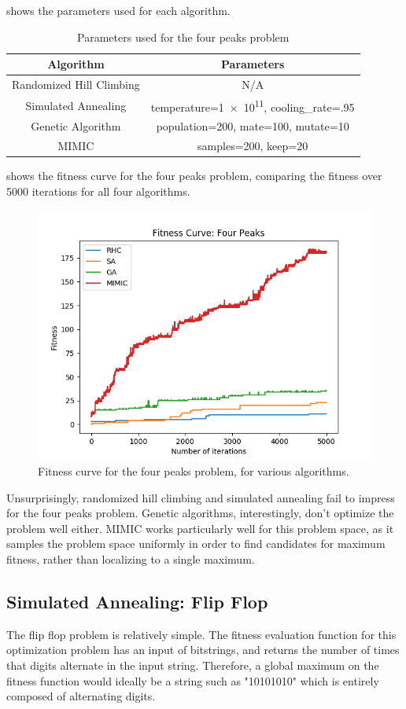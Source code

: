 \documentclass{article}
\begin{document}
       shows the parameters used for each algorithm.

      \begin{table}[h!]
      \centering
        \begin{tabular}{||c|c||}\hline
          \textbf{Algorithm} & \textbf{Parameters} \\ \hline
          Randomized Hill Climbing & N/A \\ \hline
          Simulated Annealing & temperature=\num{1e11}, cooling\_rate=.95 \\ \hline
          Genetic Algorithm & population=200, mate=100, mutate=10 \\ \hline
          MIMIC & samples=200, keep=20 \\ \hline
        \end{tabular}

        \caption{Parameters used for the four peaks problem}
        \label{tab:fp-params}
      \end{table}

       shows the fitness curve for the four peaks problem, comparing the fitness over 5000 iterations for all four algorithms.

      \begin{figure}[htb]
      \centering
      \includegraphics[width=.5\linewidth]{out/op/fourpeaks/fitness.png}
      \caption{Fitness curve for the four peaks problem, for various algorithms.}
      \label{fig:fitness-fp}
      \end{figure}

      Unsurprisingly, randomized hill climbing and simulated annealing fail to impress for the four peaks problem. Genetic algorithms, interestingly, don't optimize the problem well either. MIMIC works particularly well for this problem space, as it samples the problem space uniformly in order to find candidates for maximum fitness, rather than localizing to a single maximum.

    \subsection{Simulated Annealing: Flip Flop}
      The flip flop problem is relatively simple. The fitness evaluation function for this optimization problem has an input of bitstrings, and returns the number of times that digits alternate in the input string. Therefore, a global maximum on the fitness function would ideally be a string such as "10101010" which is entirely composed of alternating digits.
\end{document}
